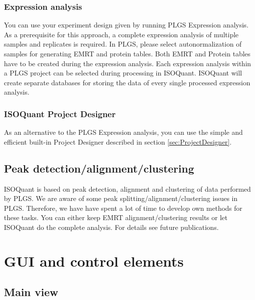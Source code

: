 \documentclass[]{article}
\begin{document}
\subsubsection{Expression analysis}\label{expression-analysis}

You can use your experiment design given by running PLGS Expression
analysis. As a prerequisite for this approach, a complete expression
analysis of multiple samples and replicates is required. In PLGS, please
select autonormalization of samples for generating EMRT and protein
tables. Both EMRT and Protein tables have to be created during the
expression analysis. Each expression analysis within a PLGS project can
be selected during processing in ISOQuant. ISOQuant will create separate
databases for storing the data of every single processed expression
analysis.

\subsubsection{ISOQuant Project
Designer}\label{isoquant-project-designer}

As an alternative to the PLGS Expression analysis, you can use the
simple and efficient built-in Project Designer described in section
\ref{sec:ProjectDesigner}.

\subsection{Peak
detection/alignment/clustering}\label{peak-detectionalignmentclustering}

ISOQuant is based on peak detection, alignment and clustering of data
performed by PLGS. We are aware of some peak
splitting/alignment/clustering issues in PLGS. Therefore, we have have
spent a lot of time to develop own methods for these tasks. You can
either keep EMRT alignment/clustering results or let ISOQuant do the
complete analysis. For details see future publications.

\clearpage

\section{GUI and control elements}\label{gui-and-control-elements}

\subsection{Main view}\label{main-view}
\end{document}
